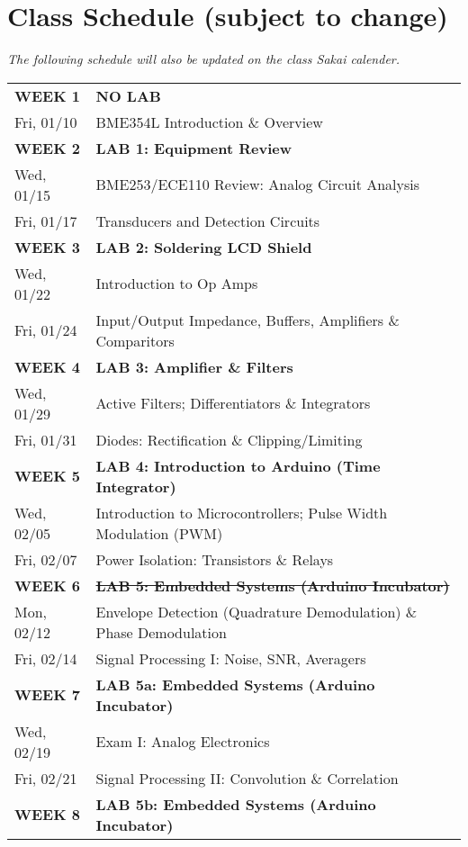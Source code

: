 \section{Class Schedule (subject to change)}
\emph{The following schedule will also be updated on the class Sakai calender.}\\
\begin{tabular}{|l|l|} \hline
{\bf WEEK 1}      &   {\bf NO LAB} \\
Fri, 01/10  &   BME354L Introduction \& Overview \\ \hline
{\bf WEEK 2}      &   {\bf LAB 1: Equipment Review} \\
Wed, 01/15  &   BME253/ECE110 Review: Analog Circuit Analysis\\
Fri, 01/17  &   Transducers and Detection Circuits \\ \hline
{\bf WEEK 3}      &   {\bf LAB 2: Soldering LCD Shield} \\
Wed, 01/22  &   Introduction to Op Amps \\ 
Fri, 01/24  &   Input/Output Impedance, Buffers, Amplifiers \& Comparitors \\ \hline
{\bf WEEK 4}      &   {\bf LAB 3: Amplifier \& Filters} \\
Wed, 01/29  &   Active Filters; Differentiators \& Integrators \\
Fri, 01/31  &   Diodes: Rectification \& Clipping/Limiting \\ \hline
{\bf WEEK 5}      &   {\bf LAB 4: Introduction to Arduino (Time Integrator)} \\
Wed, 02/05  &   Introduction to Microcontrollers; Pulse Width Modulation (PWM)\\
Fri, 02/07  &   Power Isolation: Transistors \& Relays \\ \hline
{\bf WEEK 6}      &   \textbf{\st{LAB 5: Embedded Systems (Arduino Incubator)}} \\
Mon, 02/12  &   Envelope Detection (Quadrature Demodulation) \& Phase Demodulation \\ 
Fri, 02/14  &   Signal Processing I: Noise, SNR, Averagers\\ \hline
{\bf WEEK 7}      &   {\bf LAB 5a: Embedded Systems (Arduino Incubator)} \\
Wed, 02/19  &   Exam I: Analog Electronics \\ 
Fri, 02/21  &   Signal Processing II: Convolution \& Correlation\\ \hline
{\bf WEEK 8}      &   {\bf LAB 5b: Embedded Systems (Arduino Incubator)} \\

\end{tabular}

